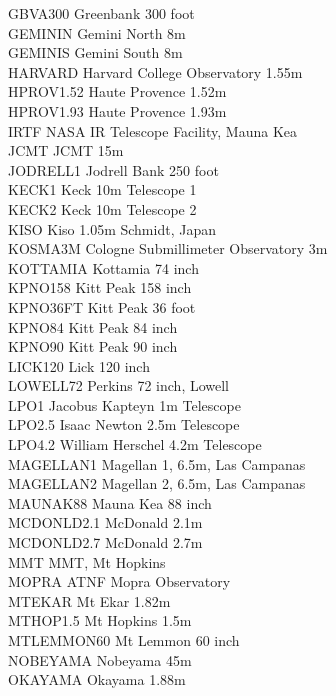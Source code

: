\documentclass[11pt,twoside,nolof]{starlink}
\begin{document}
{\begin{tabbing}
GBVA300 \> Greenbank 300 foot \\
GEMININ \> Gemini North 8m \\
GEMINIS \> Gemini South 8m \\
HARVARD \> Harvard College Observatory 1.55m \\
HPROV1.52 \> Haute Provence 1.52m \\
HPROV1.93 \> Haute Provence 1.93m \\
IRTF \> NASA IR Telescope Facility, Mauna Kea \\
JCMT \> JCMT 15m \\
JODRELL1 \> Jodrell Bank 250 foot \\
KECK1 \> Keck 10m Telescope 1 \\
KECK2 \> Keck 10m Telescope 2 \\
KISO \> Kiso 1.05m Schmidt, Japan \\
KOSMA3M \> Cologne Submillimeter Observatory 3m \\
KOTTAMIA \> Kottamia 74 inch \\
KPNO158 \> Kitt Peak 158 inch \\
KPNO36FT \> Kitt Peak 36 foot \\
KPNO84 \> Kitt Peak 84 inch \\
KPNO90 \> Kitt Peak 90 inch \\
LICK120 \> Lick 120 inch \\
LOWELL72 \> Perkins 72 inch, Lowell \\
LPO1 \> Jacobus Kapteyn 1m Telescope \\
LPO2.5 \> Isaac Newton 2.5m Telescope \\
LPO4.2 \> William Herschel 4.2m Telescope \\
MAGELLAN1 \> Magellan 1, 6.5m, Las Campanas \\
MAGELLAN2 \> Magellan 2, 6.5m, Las Campanas \\
MAUNAK88 \> Mauna Kea 88 inch \\
MCDONLD2.1 \> McDonald 2.1m \\
MCDONLD2.7 \> McDonald 2.7m \\
MMT \> MMT, Mt Hopkins \\
MOPRA \> ATNF Mopra Observatory \\
MTEKAR \> Mt Ekar 1.82m \\
MTHOP1.5 \> Mt Hopkins 1.5m \\
MTLEMMON60 \> Mt Lemmon 60 inch \\
NOBEYAMA \> Nobeyama 45m \\
OKAYAMA \> Okayama 1.88m \\

\end{tabbing}}
\end{document}
